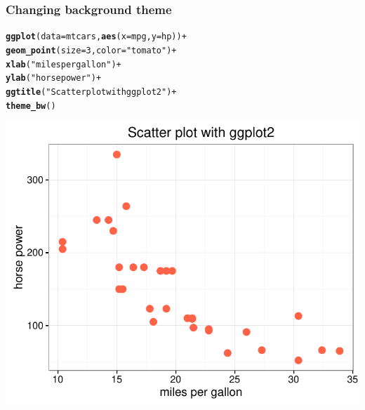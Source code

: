 \documentclass[12pt]{beamer}\usepackage[]{graphicx}\usepackage[]{color}
\makeatletter
\newcommand{\hlnum}[1]{\textcolor[rgb]{0.686,0.059,0.569}{#1}}%
\newcommand{\hlstr}[1]{\textcolor[rgb]{0.192,0.494,0.8}{#1}}%
\newcommand{\hlopt}[1]{\textcolor[rgb]{0,0,0}{#1}}%
\newcommand{\hlstd}[1]{\textcolor[rgb]{0.345,0.345,0.345}{#1}}%
\newcommand{\hlkwc}[1]{\textcolor[rgb]{0.333,0.667,0.333}{#1}}%
\newcommand{\hlkwd}[1]{\textcolor[rgb]{0.737,0.353,0.396}{\textbf{#1}}}%
\newenvironment{kframe}{%
 \def\at@end@of@kframe{}%
 \ifinner\ifhmode%
  \def\at@end@of@kframe{\end{minipage}}%
  \begin{minipage}{\columnwidth}%
 \fi\fi%
 \def\FrameCommand##1{\hskip\@totalleftmargin \hskip-\fboxsep
 \colorbox{shadecolor}{##1}\hskip-\fboxsep
     \hskip-\linewidth \hskip-\@totalleftmargin \hskip\columnwidth}%
 \MakeFramed {\advance\hsize-\width
   \@totalleftmargin\z@ \linewidth\hsize
   \@setminipage}}%
 {\par\unskip\endMakeFramed%
 \at@end@of@kframe}
\newenvironment{knitrout}{}{} %
\makeatother
\begin{document}
\begin{frame}[fragile]
\frametitle{Changing background theme}
\begin{knitrout}\scriptsize
{}\color{fgcolor}\begin{kframe}
\begin{alltt}
\hlkwd{ggplot}\hlstd{(}\hlkwc{data} \hlstd{= mtcars,} \hlkwd{aes}\hlstd{(}\hlkwc{x} \hlstd{= mpg,} \hlkwc{y} \hlstd{= hp))} \hlopt{+}
  \hlkwd{geom_point}\hlstd{(}\hlkwc{size} \hlstd{=} \hlnum{3}\hlstd{,} \hlkwc{color} \hlstd{=} \hlstr{"tomato"}\hlstd{)} \hlopt{+}
  \hlkwd{xlab}\hlstd{(}\hlstr{"miles per gallon"}\hlstd{)} \hlopt{+}
  \hlkwd{ylab}\hlstd{(}\hlstr{"horse power"}\hlstd{)} \hlopt{+}
  \hlkwd{ggtitle}\hlstd{(}\hlstr{"Scatter plot with ggplot2"}\hlstd{)} \hlopt{+}
  \hlkwd{theme_bw}\hlstd{()}
\end{alltt}
\end{kframe}

{\centering \includegraphics[width=.6\linewidth,height=.5\linewidth]{figure/xyplot_mtcars6-1} 

}



\end{knitrout}
\end{frame}

\end{document}
